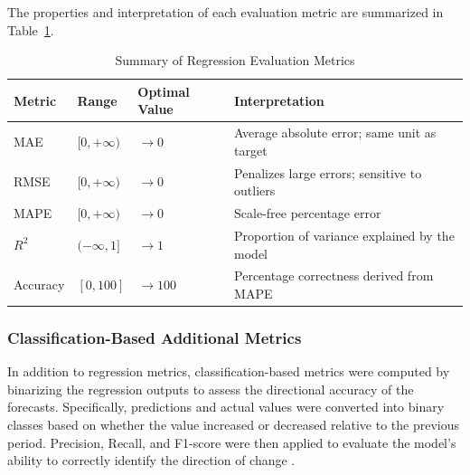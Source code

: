 \documentclass[final, 9pt, twocolumn]{saucis}
\begin{document}
The properties and interpretation of each evaluation metric are 
summarized in Table~\ref{tab:metrics_summary}.

\begin{table}[htbp]
\centering
\caption{Summary of Regression Evaluation Metrics}
\label{tab:metrics_summary}
\small
\begin{tabular}{p{0.9cm} p{1cm} p{1cm} p{4.3cm}}
\hline
Metric & Range & Optimal Value & Interpretation \\
\hline
MAE      & $[0, +\infty)$ & $\rightarrow 0$   & Average absolute error; same unit as target \\
RMSE     & $[0, +\infty)$ & $\rightarrow 0$   & Penalizes large errors; sensitive to outliers \\
MAPE     & $[0, +\infty)$ & $\rightarrow 0$   & Scale-free percentage error \\
$R^{2}$  & $(-\infty, 1]$ & $\rightarrow 1$   & Proportion of variance explained by the model \\
Accuracy & $[0, 100]$     & $\rightarrow 100$ & Percentage correctness derived from MAPE \\
\hline
\end{tabular}
\end{table}

\subsubsection{Classification-Based Additional Metrics}

In addition to regression metrics, classification-based metrics were computed by binarizing the regression outputs to assess the directional accuracy of the forecasts. Specifically, predictions and actual values were converted into binary classes based on whether the value increased or decreased relative to the previous period. Precision, Recall, and F1-score were then applied to evaluate the model's ability to correctly identify the direction of change \cite{method20}.
\end{document}
